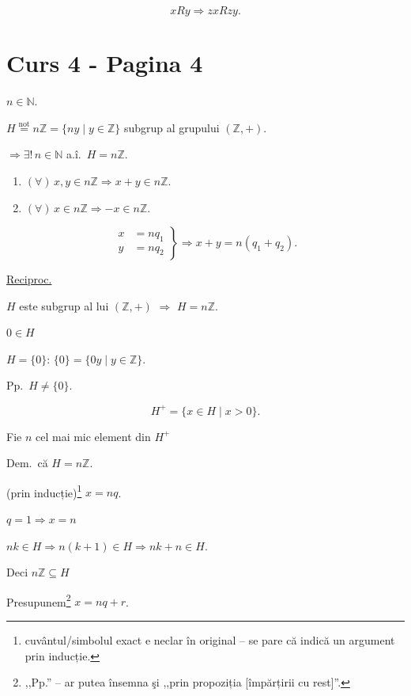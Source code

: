 \[
xRy \Rightarrow zxRzy.
\]



\section*{Curs 4 - Pagina 4}

\noindent $n\in\mathbb{N}$.

\bigskip
\noindent $H \overset{\text{not}}{=} n\mathbb{Z} = \{ny \mid y\in\mathbb{Z}\}$ subgrup al grupului $(\mathbb{Z},+)$.

\noindent $\Rightarrow \exists!\, n\in\mathbb{N}$ a.î.\ $H=n\mathbb{Z}$.

\begin{enumerate}
\item[1)] $(\forall)\, x,y\in n\mathbb{Z} \Rightarrow x+y\in n\mathbb{Z}$.
\item[2)] $(\forall)\, x\in n\mathbb{Z} \Rightarrow -x\in n\mathbb{Z}$.
\end{enumerate}

\[
\left.\begin{aligned}
x&=nq_1\\
y&=nq_2
\end{aligned}\right\} \Rightarrow x+y = n(q_1+q_2).
\]

\bigskip
\noindent\underline{Reciproc.}

\noindent $H$ este subgrup al lui $(\mathbb{Z},+)$ $\Rightarrow$ $H=n\mathbb{Z}$.

\noindent $0\in H$

\noindent $H=\{0\}$: \quad $\{0\} = \{0y \mid y\in\mathbb{Z}\}$.

\noindent Pp.\ $H\neq\{0\}$.

\[
H^+ = \{x\in H \mid x>0\}.
\]

\noindent Fie $n$ cel mai mic element din $H^+$

\noindent Dem.\ că $H=n\mathbb{Z}$.

\bigskip
\noindent (prin inducție)\footnote{cuvântul/simbolul exact e neclar în original -- se pare că indică un argument prin inducție.} $x=nq$.

\noindent $q=1 \Rightarrow x=n$

\noindent $nk\in H \Rightarrow n(k+1)\in H \Rightarrow nk+n\in H$.

\noindent Deci $n\mathbb{Z}\subseteq H$

\bigskip
\noindent Presupunem\footnote{,,Pp.'' -- ar putea însemna şi ,,prin propoziția [împărțirii cu rest]''.} $x=nq+r$.

